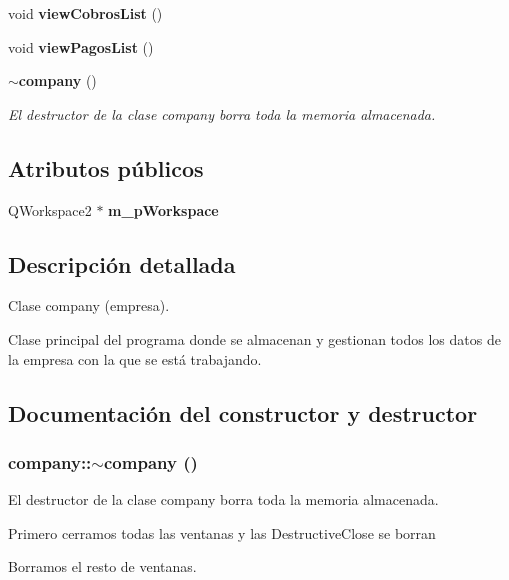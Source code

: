 \begin{CompactItemize}
\item 
void {\bf view\-Cobros\-List} ()\label{classcompany_a71}

\item 
void {\bf view\-Pagos\-List} ()\label{classcompany_a72}

\item 
{\bf $\sim$company} ()
\begin{CompactList}\small\item\em El destructor de la clase company borra toda la memoria almacenada. \item\end{CompactList}\end{CompactItemize}
\subsection*{Atributos p\'{u}blicos}
\begin{CompactItemize}
\item 
QWorkspace2 $\ast$ {\bf m\_\-p\-Workspace}\label{classcompany_o0}

\end{CompactItemize}


\subsection{Descripci\'{o}n detallada}
Clase company (empresa). 

Clase principal del programa donde se almacenan y gestionan todos los datos de la empresa con la que se est\'{a} trabajando. 



\subsection{Documentaci\'{o}n del constructor y destructor}
\subsubsection{\setlength{\rightskip}{0pt plus 5cm}company::$\sim$company ()}\label{classcompany_a73}


El destructor de la clase company borra toda la memoria almacenada. 

Primero cerramos todas las ventanas y las Destructive\-Close se borran

Borramos el resto de ventanas. 

